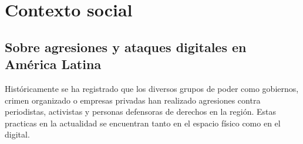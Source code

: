\documentclass[12pt]{caltech_thesis}
\begin{document}





\chapter{Contexto social}

\section{Sobre agresiones y ataques digitales en América Latina}

Históricamente se ha registrado que los diversos grupos de poder como gobiernos, crimen organizado o empresas privadas han realizado agresiones contra periodistas, activistas y personas defensoras de derechos en la región. Estas practicas en la actualidad se encuentran tanto en el espacio físico como en el digital. \citep{AmnestyInternational-Mexico-2023, Articulo19-Reporte-2022, Articulo19-Reporte-2023, CIMAC-Informe-2022, Internews-Reporte-2023}
\end{document}
